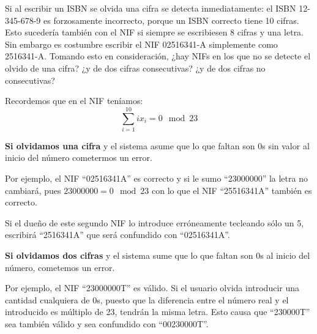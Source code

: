 \begin{problem}[4]
 Si al escribir un ISBN se olvida una cifra se detecta
inmediatamente: el ISBN 12-345-678-9 es forzosamente incorrecto,
porque un ISBN correcto tiene 10 cifras. Esto sucedería también
con el NIF si siempre se escribiesen 8 cifras y una letra. Sin
embargo es costumbre escribir el NIF 02516341-A simplemente como
2516341-A. Tomando esto en consideración, ¿hay NIFs en los que no
se detecte el olvido de una cifra? ¿y de dos cifras consecutivas?
¿y de dos cifras no consecutivas?
\solution

Recordemos que en el NIF teníamos:
\[\sum_{i=1}^{10}ix_i = 0 \mod 23\]

\textbf{Si olvidamos una cifra} y el sistema asume que lo que faltan son 0s sin valor al inicio del número cometermos un error.

Por ejemplo, el NIF ``02516341A'' es correcto y si le sumo ``23000000'' la letra no cambiará, pues $23000000=0\mod 23$ con lo que el NIF ``25516341A'' también es correcto.

Si el dueño de este segundo NIF lo introduce erróneamente tecleando sólo un 5, escribirá ``2516341A'' que será confundido con ``02516341A''.

\textbf{Si olvidamos dos cifras} y el sistema sume que lo que faltan son 0s al inicio del número, cometemos un error.

Por ejemplo, el NIF ``23000000T'' es válido. Si el usuario olvida introducir una cantidad cualquiera de 0s, puesto que la diferencia entre el número real y el introducido es múltiplo de 23, tendrán la misma letra. Esto causa que ``230000T'' sea también válido y sea confundido con ``00230000T''.

\end{problem}

